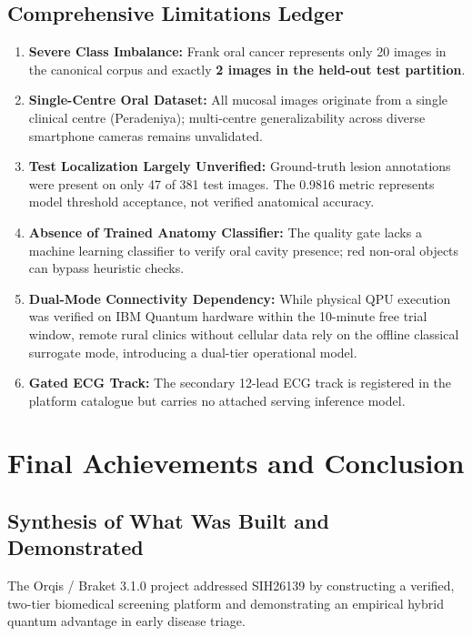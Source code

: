 \documentclass[11pt,a4paper]{report}
\begin{document}
\section{Comprehensive Limitations Ledger}
\begin{enumerate}
  \item \textbf{Severe Class Imbalance:} Frank oral cancer represents only 20 images in the canonical corpus and exactly \textbf{2 images in the held-out test partition}.
  \item \textbf{Single-Centre Oral Dataset:} All mucosal images originate from a single clinical centre (Peradeniya); multi-centre generalizability across diverse smartphone cameras remains unvalidated.
  \item \textbf{Test Localization Largely Unverified:} Ground-truth lesion annotations were present on only 47 of 381 test images. The 0.9816 metric represents model threshold acceptance, not verified anatomical accuracy.
  \item \textbf{Absence of Trained Anatomy Classifier:} The quality gate lacks a machine learning classifier to verify oral cavity presence; red non-oral objects can bypass heuristic checks.
  \item \textbf{Dual-Mode Connectivity Dependency:} While physical QPU execution was verified on IBM Quantum hardware within the 10-minute free trial window, remote rural clinics without cellular data rely on the offline classical surrogate mode, introducing a dual-tier operational model.
  \item \textbf{Gated ECG Track:} The secondary 12-lead ECG track is registered in the platform catalogue but carries no attached serving inference model.
\end{enumerate}

\chapter{Final Achievements and Conclusion}

\section{Synthesis of What Was Built and Demonstrated}
The Orqis / Braket 3.1.0 project addressed SIH26139 by constructing a verified, two-tier biomedical screening platform and demonstrating an empirical hybrid quantum advantage in early disease triage.
\end{document}
